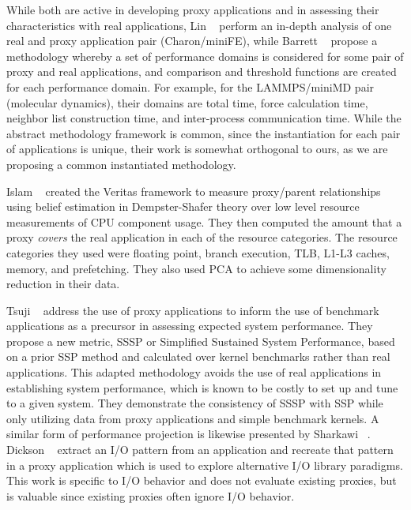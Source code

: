 While both are active in developing proxy applications and in assessing their characteristics with real applications, Lin \etal~\cite{CPE:CPE3587} perform an in-depth analysis of one real and proxy application pair (Charon/miniFE), while Barrett \etal~\cite{BARRETT2015107} propose a methodology whereby a set of performance domains is considered for some pair of proxy and real applications, and comparison and threshold functions are created for each performance domain.  For example, for the LAMMPS/miniMD pair (molecular dynamics), their domains are total time, force calculation time, neighbor list construction time, and inter-process communication time. While the abstract methodology framework is common, since the instantiation for each pair of applications is unique, their work is somewhat orthogonal to ours, as we are proposing a common instantiated methodology.

Islam \etal~\cite{Islam:2016:MLF:3014904.3014966} created the Veritas framework to measure proxy/parent relationships using belief estimation in Dempster-Shafer theory over low level resource measurements of CPU component usage. They then computed the amount that a proxy \emph{covers} the real application in each of the resource categories. The resource categories they used were floating point, branch execution, TLB, L1-L3 caches, memory, and prefetching. They also used PCA to achieve some dimensionality reduction in their data.

Tsuji \etal~\cite{8049025} address the use of proxy applications to inform the use of benchmark applications as a precursor in assessing expected system performance. They propose a new metric, SSSP or Simplified Sustained System Performance, based on a prior SSP method and calculated over kernel benchmarks rather than real applications. This adapted methodology avoids the use of real applications in establishing system performance, which is known to be costly to set up and tune to a given system. They demonstrate the consistency of SSSP with SSP while only utilizing data from proxy applications and simple benchmark kernels. A similar form of performance projection is likewise presented by Sharkawi \etal~\cite{sharkawi2009performance}. Dickson \etal~\cite{7836562} extract an I/O pattern from an application and recreate that pattern in a proxy application which is used to explore alternative I/O library paradigms. This work is specific to I/O behavior and does not evaluate existing proxies, but is valuable since existing proxies often ignore I/O behavior.

